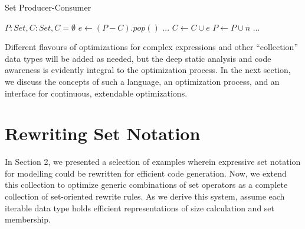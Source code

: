 \documentclass{article}
\begin{document}
\begin{algorithm}
  \caption{Set Producer-Consumer}
  \begin{algorithmic}
    \Require $P: Set, C: Set, C = \emptyset$
      \State $e \gets (P - C).pop()$
      ... 
      \State $C \gets C \cup {e}$
      \State $P \gets P \cup {n}$ ... 
    \EndWhile
  \end{algorithmic}
  \label{fig:prodcons}
\end{algorithm}

Different flavours of optimizations for complex expressions and other ``collection'' data types will be added as needed, but the deep static analysis and code awareness is evidently integral to the optimization process. In the next section, we discuss the concepts of such a language, an optimization process, and an interface for continuous, extendable optimizations.

\section{Rewriting Set Notation}

In Section 2, we presented a selection of examples wherein expressive set notation for modelling could be rewritten for efficient code generation. Now, we extend this collection to optimize generic combinations of set operators as a complete collection of set-oriented rewrite rules. As we derive this system, assume each iterable data type holds efficient representations of size calculation and set membership.


\end{document}
